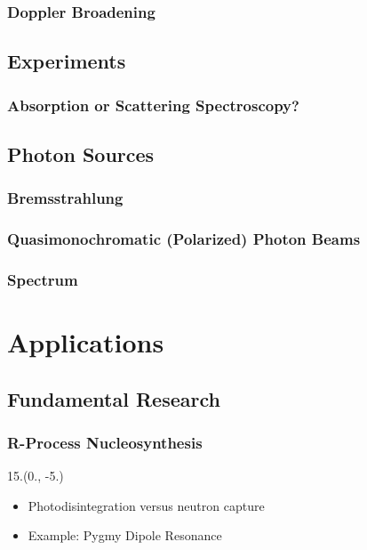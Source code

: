 \documentclass{beamer}
\begin{document}
\begin{frame}
    \frametitle{Doppler Broadening}
    
\end{frame}

\subsection{Experiments}

\begin{frame}
    \frametitle{Absorption or Scattering Spectroscopy?}
\end{frame}

\subsection{Photon Sources}

\begin{frame}
    \frametitle{Bremsstrahlung}
    
\end{frame}

\begin{frame}
    \frametitle{Quasimonochromatic (Polarized) Photon Beams}
    
\end{frame}

\begin{frame}
    \frametitle{Spectrum}
    
\end{frame}

\section{Applications}

\subsection{Fundamental Research}

\begin{frame}
    \frametitle{R-Process Nucleosynthesis}
    \begin{textblock}{15.}(0., -5.)
        \begin{itemize}
            \item Photodisintegration versus neutron capture
            \item Example: Pygmy Dipole Resonance
        \end{itemize}
    \end{textblock}    
\end{frame}
\end{document}
